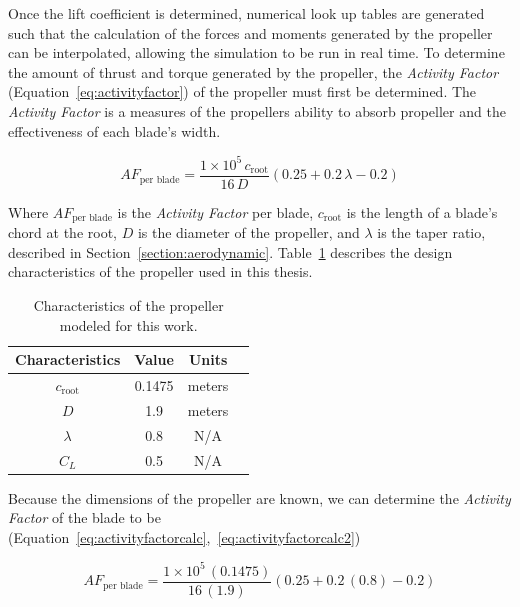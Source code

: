 \documentclass[12pt]{report}
\begin{document}
Once the lift coefficient is determined, numerical look up tables are generated such that the calculation of the forces and moments generated by the propeller can be interpolated, allowing the simulation to be run in real time. To determine the amount of thrust and torque generated by the propeller, the \textit{Activity Factor} (Equation~\ref{eq:activityfactor}) of the propeller must first be determined. The \textit{Activity Factor} is a measures of the propellers ability to absorb propeller and the effectiveness of each blade's width.

\begin{equation}\label{eq:activityfactor}
  AF_{\textrm{per blade}} = \frac{1 \times 10^5 \, c_{\textrm{root}}}{16 \, D} \left(0.25 + 0.2 \, \lambda - 0.2 \right)
\end{equation}

Where \(AF_{\textrm{per blade}}\) is the \textit{Activity Factor} per blade, \(c_{\textrm{root}}\) is the length of a blade's chord at the root, \(D\) is the diameter of the propeller, and \( \lambda \) is the taper ratio, described in Section~\ref{section:aerodynamic}. Table~\ref{tbl:propparams} describes the design characteristics of the propeller used in this thesis.

\begin{table}[!ht]\label{tbl:propparams}
  \caption{Characteristics of the propeller modeled for this work.}
  \centering
  \begin{tabular}{cccc}
    \toprule
    Characteristics       & Value  & Units  \\
    \midrule
    \(c_{\textrm{root}}\) & 0.1475 & meters \\
    \(D\)                 & 1.9    & meters \\
    \( \lambda \)         & 0.8    & N/A    \\
    \(C_L\)               & 0.5    & N/A    \\
    \bottomrule
  \end{tabular}
\end{table}

Because the dimensions of the propeller are known, we can determine the \textit{Activity Factor} of the blade to be (Equation~\ref{eq:activityfactorcalc},~\ref{eq:activityfactorcalc2})

\begin{equation}\label{eq:activityfactorcalc}
  AF_{\textrm{per blade}} = \frac{1 \times 10^5 \, (0.1475)}{16 \, (1.9)} \left(0.25 + 0.2 \, (0.8) - 0.2 \right)
\end{equation}
\end{document}
